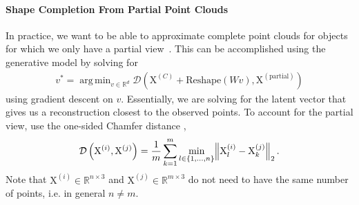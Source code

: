 \documentclass{article}
\DeclareMathOperator*{\argmin}{arg\,min}
\newcommand{\pcx}[1]{\mathrm{X}^{(#1)}}
\newcommand{\wxy}[2]{W_{#1 \rightarrow #2}}
\newcommand{\vxy}[2]{V_{#1 \rightarrow #2}}
\newcommand{\pci}{\pcx{i}}
\newcommand{\pcj}{\pcx{j}}
\newcommand{\pcc}{\pcx{C}}
\newcommand{\wij}{\wxy{i}{j}}
\begin{document}

\paragraph{Shape Completion From Partial Point Clouds}

In practice, we want to be able to approximate complete point clouds for objects for which we only have a partial view~\cite{thompson21shapebased}. This can be accomplished using the generative model by solving for 
\begin{align}
    v^* = \argmin_{v \in \mathbb{R}^{d}} \mathcal{D}(\pcc + \mathrm{Reshape}(Wv), \pcx{\mathrm{partial}})
\end{align}
using gradient descent on $v$. Essentially, we are solving for the latent vector that gives us a reconstruction closest to the observed points. To account for the partial view, \citet{thompson21shapebased} use the one-sided Chamfer distance \cite{barrow77parametric},
\begin{align}
    \mathcal{D}\left( \pci, \pcj \right) = \frac{1}{m} \sum_{k=1}^{m} \min_{l \in \{1, ..., n\}} \norm{ \pci_l - \pcj_k }_2.
    \label{eqn:chamfer}
\end{align}
Note that $\pci \in \mathbb{R}^{n \times 3}$ and $\pcj \in \mathbb{R}^{m \times 3}$ do not need to have the same number of points, i.e. in general $n \neq m$. 



\end{document}
